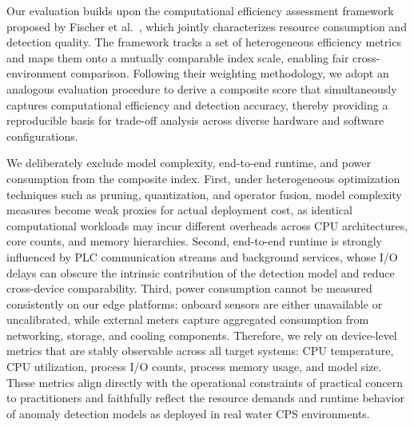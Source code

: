 \documentclass[pdflatex,sn-mathphys-num]{sn-jnl}%
\theoremstyle{thmstyleone}
\theoremstyle{thmstyletwo}%
\theoremstyle{thmstylethree}%
\begin{document}
Our evaluation builds upon the computational efficiency assessment framework proposed by Fischer et al.~\cite{efficiency_framework}, which jointly characterizes resource consumption and detection quality. The framework tracks a set of heterogeneous efficiency metrics and maps them onto a mutually comparable index scale, enabling fair cross-environment comparison. Following their weighting methodology, we adopt an analogous evaluation procedure to derive a composite score that simultaneously captures computational efficiency and detection accuracy, thereby providing a reproducible basis for trade-off analysis across diverse hardware and software configurations.

We deliberately exclude model complexity, end-to-end runtime, and power consumption from the composite index.
First, under heterogeneous optimization techniques such as pruning, quantization, and operator fusion, model complexity measures become weak proxies for actual deployment cost, as identical computational workloads may incur different overheads across CPU architectures, core counts, and memory hierarchies.
Second, end-to-end runtime is strongly influenced by PLC communication streams and background services, whose I/O delays can obscure the intrinsic contribution of the detection model and reduce cross-device comparability.
Third, power consumption cannot be measured consistently on our edge platforms: onboard sensors are either unavailable or uncalibrated, while external meters capture aggregated consumption from networking, storage, and cooling components.
Therefore, we rely on device-level metrics that are stably observable across all target systems: CPU temperature, CPU utilization, process I/O counts, process memory usage, and model size. These metrics align directly with the operational constraints of practical concern to practitioners and faithfully reflect the resource demands and runtime behavior of anomaly detection models as deployed in real water CPS environments.
\end{document}
